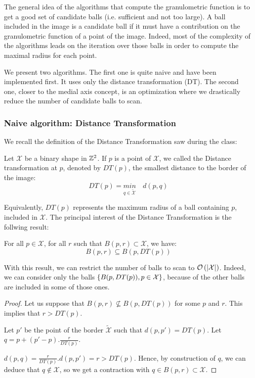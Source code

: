 The general idea of the algorithms that compute the granulometric function is to get a good set of candidate balls (i.e. sufficient and not too large). A ball included in the image is a candidate ball if it must have a contribution on the granulometric function of a point of the image. Indeed, most of the complexity of the algorithms leads on the iteration over those balls in order to compute the maximal radius for each point. 

We present two algorithms. The first one is quite naive and have been implemented first. It uses only the distance transformation (DT). The second one, closer to the medial axis concept, is an optimization where we drastically reduce the number of candidate balls to scan.

\subsubsection{Naive algorithm: Distance Transformation}

We recall the definition of the Distance Transformation saw during the class:

\begin{definition}
Let $\mathcal{X}$ be a binary shape in $\mathbb{Z}^{2}$. If $p$ is a point of $\mathcal{X}$, we called the Distance transformation at $p$, denoted by $DT(p)$, the smallest distance to the border of the image:
$$ DT(p) = \underset{q \in \widetilde{\mathcal{X}}}{min} \quad d(p,q) $$
\end{definition}

Equivalently, $DT(p)$ represents the maximum radius of a ball containing $p$, included in $\mathcal{X}$. The principal interest of the Distance Transformation is the follwing result:

\begin{theoreme}
	For all $p \in \mathcal{X}$, for all $r$ such that $B(p,r) \subset \mathcal{X}$, we have:
		$$ B(p,r) \subseteq B(p,DT(p))$$
\label{theoremDT}
\end{theoreme}

With this result, we can restrict the number of balls to scan to $\mathcal O \left( \left| \mathcal{X} \right| \right)$. Indeed, we can consider only the balls $\left\{ B(p,DT(p)), p \in \mathcal{X} \right\}$, because of the other balls are included in some of those ones.

\begin{proof}
	
Let us suppose that $B(p,r) \nsubseteq B(p,DT(p))$ for some $p$ and $r$. This implies that $r > DT(p)$.

Let $p'$ be the point of the border $\widetilde{\mathcal{X}}$ such that $d(p,p') = DT(p)$. Let $q = p + (p'-p).\frac{r}{DT(p)}.$ 

$d(p,q) = \frac{r}{DT(p)}.d(p,p') = r > DT(p)$. Hence, by construction of $q$, we can deduce that $q \notin \mathcal{X}$, so we get a contraction with $q \in B(p,r) \subset \mathcal{X}$. 

\end{proof}

